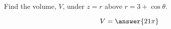 \documentclass{ximera}
\author{David Guichard \and Neal Koblitz \and H. Jerome Keisler \and Albert Scheller \and Barry Balof \and Mike Wills \and Matthew Carr}
\begin{document}
\begin{exercise}





Find the volume, $V$, under $z=r$ above $r=3+\cos\theta$.

\begin{prompt}
\[
V=\answer{21\pi}
\]
\end{prompt}



\end{exercise}
\end{document}
